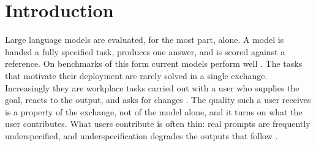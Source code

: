 %

\section{Introduction}

Large language models are evaluated, for the most part, alone. A model is handed a fully
specified task, produces one answer, and is scored against a reference. On benchmarks of
this form current models perform well \cite{liang2023holistic}. The tasks
that motivate their deployment are rarely solved in a single exchange. Increasingly they
are workplace tasks carried out with a user who supplies the goal, reacts to the output,
and asks for changes \cite{anthropic2025economicindex, laban2025lost}. The quality such a
user receives is a property of the exchange, not of the model alone, and it turns on what
the user contributes. What users contribute is often thin: real prompts are
frequently underspecified, and underspecification degrades the outputs that follow
\cite{yang2025underspecification}.


